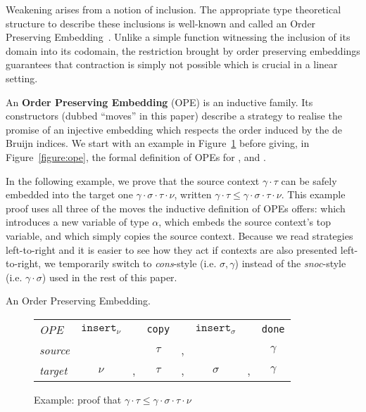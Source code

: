Weakening arises from a notion of inclusion. The appropriate type
theoretical structure to describe these inclusions is well-known
and called an Order Preserving Embedding~\cite{chapman2009thesis,altenkirch1995categorical}.
Unlike a simple function witnessing the inclusion of its domain
into its codomain, the restriction brought by order preserving
embeddings guarantees that contraction is simply not possible which
is crucial in a linear setting.

\begin{definition}
An \textbf{Order Preserving Embedding} (OPE) is an inductive family. Its
constructors (dubbed ``moves'' in this paper) describe a strategy to realise
the promise of an injective embedding which respects the order induced by
the de Bruijn indices. We start with an example in Figure~\ref{figure:exampleOpe}
before giving, in Figure~\ref{figure:ope}, the formal definition of OPEs for
\Nat{}, \Context{} and \Usages{}.
\end{definition}

In the following example, we prove that the source context $\gamma \ensuremath{\cdot} \tau$
can be safely embedded into the target one $\gamma \ensuremath{\cdot} \sigma \ensuremath{\cdot} \tau \ensuremath{\cdot} \nu$,
written $\gamma \ensuremath{\cdot} \tau \leq \gamma \ensuremath{\cdot} \sigma \ensuremath{\cdot} \tau \ensuremath{\cdot} \nu$. This example proof
uses all three of the moves the inductive definition of OPEs offers:
\opeinsert{\alpha} which introduces a new variable of type $\alpha$,
\opecopy{} which embeds the source context's top variable, and \opedone{}
which simply copies the source context. Because we read
strategies left-to-right and it is easier to see how they act if contexts
are also presented left-to-right, we temporarily switch to \emph{cons}-style
(i.e. $\sigma , \gamma$) instead of the \emph{snoc}-style (i.e. $\gamma \ensuremath{\cdot} \sigma$)
used in the rest of this paper.

\begin{example} An Order Preserving Embedding.

\begin{figure}[ht]\centering
\begin{tabular}{l|ccccccc}
\textit{OPE} & $\texttt{insert}_{\nu}$ &
             & \texttt{copy} &
             & $\texttt{insert}_{\sigma}$ &
             & \texttt{done}\\
\textit{source} & &
                & $\tau$ & ,
                & &
                & $\gamma$ \\
\textit{target} & $\nu$ & ,
                & $\tau$ & ,
                & $\sigma$ & ,
                & $\gamma$ \\
\end{tabular}
\caption{Example: proof that \ensuremath{\gamma \cdot \tau \leq \gamma \cdot \sigma \cdot \tau \cdot \nu}}\label{figure:exampleOpe}
\end{figure}
\end{example}

